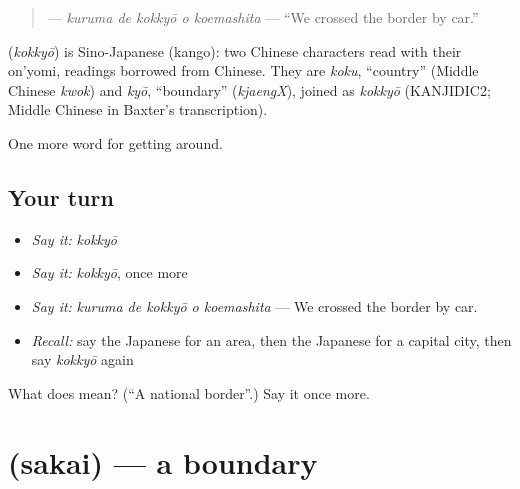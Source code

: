 \begin{quote}
\textbf{  } — \emph{kuruma de kokkyō o koemashita} — \textquotedblleft{}We crossed the border by car.\textquotedblright{}
\end{quote}

\begin{cousinweb}
\textbf{} (\emph{kokkyō}) is Sino-Japanese (kango): two Chinese characters read with their on'yomi, readings borrowed from Chinese. They are \emph{koku}, \textquotedblleft{}country\textquotedblright{} (Middle Chinese \emph{kwok}) and \emph{kyō}, \textquotedblleft{}boundary\textquotedblright{} (\emph{kjaengX}), joined as \emph{kokkyō} (KANJIDIC2; Middle Chinese in Baxter's transcription).
\end{cousinweb}

\begin{grammarlens}[title={What you've built}]
One more word for getting around.
\end{grammarlens}

\subsection*{Your turn}
\begin{itemize}
\raggedright
  \item \emph{Say it:} \emph{kokkyō}
  \item \emph{Say it:} \emph{kokkyō}, once more
  \item \emph{Say it:} \emph{kuruma de kokkyō o koemashita} — We crossed the border by car.
  \item \emph{Recall:} say the Japanese for an area, then the Japanese for a capital city, then say \emph{kokkyō} again
\end{itemize}

\begin{tcolorbox}[breakable,colback=teal!4,colframe=teal!35!black,title={Before you move on}]
What does  mean? (\textquotedblleft{}A national border\textquotedblright{}.) Say it once more.
\end{tcolorbox}
\section[\texorpdfstring{\ja{さかい} (sakai)}{さかい (sakai)}]{ (sakai) — a boundary}

\label{lesson:JA-C409-sakai}



